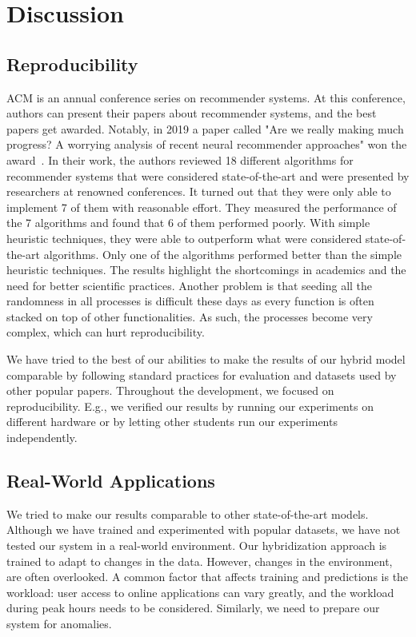 \chapter{Discussion}

\section{Reproducibility}
ACM is an annual conference series on recommender systems. At this conference, authors can present their papers about recommender systems, and the best papers get awarded. Notably, in 2019 a paper called "Are we really making much progress? A worrying analysis of recent neural recommender approaches" won the award~\cite{dacrema2019we,dacrema2021troubling}. In their work, the authors reviewed 18 different algorithms for recommender systems that were considered state-of-the-art and were presented by researchers at renowned conferences. It turned out that they were only able to implement 7 of them with reasonable effort. 
They measured the performance of the 7 algorithms and found that 6 of them performed poorly. With simple heuristic techniques, they were able to outperform what were considered state-of-the-art algorithms. Only one of the algorithms performed better than the simple heuristic techniques. The results highlight the shortcomings in academics and the need for better scientific practices. Another problem is that seeding all the randomness in all processes is difficult these days as every function is often stacked on top of other functionalities. As such, the processes become very complex, which can hurt reproducibility.

We have tried to the best of our abilities to make the results of our hybrid model comparable by following standard practices for evaluation and datasets used by other popular papers. Throughout the development, we focused on reproducibility. E.g., we verified our results by running our experiments on different hardware or by letting other students run our experiments independently.


\section{Real-World Applications}
We tried to make our results comparable to other state-of-the-art models. Although we have trained and experimented with popular datasets, we have not tested our system in a real-world environment. Our hybridization approach is trained to adapt to changes in the data. However, changes in the environment, are often overlooked. A common factor that affects training and predictions is the workload: user access to online applications can vary greatly, and the workload during peak hours needs to be considered. Similarly, we need to prepare our system for anomalies.

% 
% 